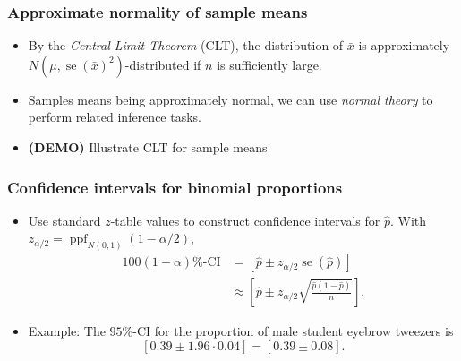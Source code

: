 \documentclass{beamer}
\DeclareMathOperator{\stderr}{se}
\DeclareMathOperator{\Bin}{Bin}
\DeclareMathOperator{\PPF}{ppf}
\begin{document}
\begin{frame}
    \frametitle{Approximate normality of sample means}
    \begin{itemize}
        \item By the \emph{Central Limit Theorem} (CLT), the distribution of $\bar{x}$
        is approximately $N(\mu, \stderr(\bar{x})^2)$-distributed if $n$ is sufficiently large.
        
        \item Samples means being approximately normal, we can use \emph{normal theory}
        to perform related inference tasks.

        \item \textbf{(DEMO)} Illustrate CLT for sample means
    \end{itemize}
\end{frame}

\begin{frame}
    \frametitle{Confidence intervals for binomial proportions}
    \begin{itemize}
        \item Use standard $z$-table values to construct confidence intervals
        for $\hat{p}$. With $z_{\alpha/2} = \PPF_{N(0, 1)}(1 - \alpha/2)$,
        \begin{align*}
        \text{$100(1-\alpha)$\%-CI} &=
        [\hat{p} \pm z_{\alpha/2}\stderr(\hat{p})]\\
        &\approx \left[\hat{p} \pm z_{\alpha/2}\sqrt{\frac{\hat{p}(1 - \hat{p})}{n}}\right].
        \end{align*}

        \item Example: The $95$\%-CI for the proportion of male student eyebrow tweezers is
        \[
        [0.39 \pm 1.96\cdot0.04]=[0.39\pm 0.08].
        \]

    \end{itemize}
\end{frame}



\end{document}

